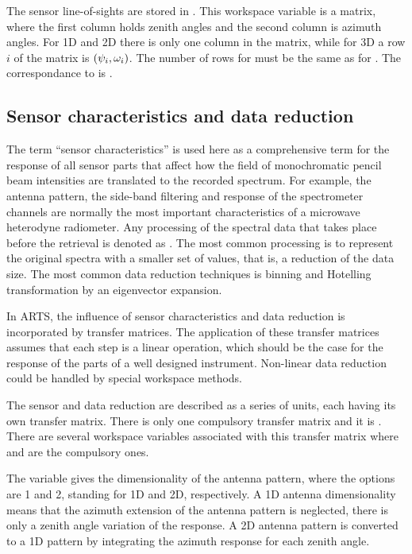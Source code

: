 The sensor line-of-sights are stored in . This workspace
variable is a matrix, where the first column holds zenith angles and the second
column is azimuth angles. For 1D and 2D there is only one column in the matrix,
while for 3D a row $i$ of the matrix is $(\psi_{i},\omega_{i})$. The number
of rows for  must be the same as for
. The correspondance to  is
.


\subsection{Sensor characteristics and data reduction}
\label{sec:fm_defs:sensorchar}

The term ``sensor characteristics'' is
used here as a comprehensive term for the response of all sensor parts
that affect how the field of monochromatic pencil beam intensities are
translated to the recorded spectrum. For example, the antenna pattern,
the side-band filtering and response of the spectrometer channels are
normally the most important characteristics of a microwave heterodyne
radiometer. Any processing of the spectral data that takes place
before the retrieval is denoted as . The
most common processing is to represent the original spectra with a
smaller set of values, that is, a reduction of the data size. The most
common data reduction techniques is binning and Hotelling
transformation by an eigenvector expansion.

In ARTS, the influence of sensor characteristics and data reduction is
incorporated by transfer matrices. The
application of these transfer matrices assumes that each step is a
linear operation, which should be the case for the response of the
parts of a well designed instrument. Non-linear data reduction could
be handled by special workspace methods.

The sensor and data reduction are described as a series of units, each having
its own transfer matrix. There is only one compulsory transfer matrix and it is
. There are several workspace variables associated
with this transfer matrix where  and
 are the compulsory ones.

The variable  gives the dimensionality of the antenna
pattern, where the options are 1 and 2,
standing for 1D and 2D, respectively. A 1D antenna dimensionality means that
the azimuth extension of the antenna pattern is neglected, there is only a
zenith angle variation of the response. A 2D antenna pattern is converted to a
1D pattern by integrating the azimuth response for each zenith angle. 


